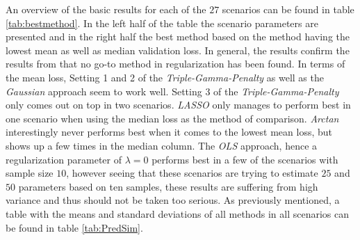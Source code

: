 \documentclass[12pt,a4paper]{article}
\begin{document}
An overview of the basic results for each of the $27$ scenarios can be found in table \ref{tab:bestmethod}. In the left half of the table the scenario parameters are presented and in the right half the best method based on the method having the lowest mean as well as median validation loss. In general, the results confirm the results from \textcite{WangEtAl2020} that no go-to method in regularization has been found. In terms of the mean loss, Setting 1 and 2 of the \textit{Triple-Gamma-Penalty} as well as the \textit{Gaussian} approach seem to work well. Setting 3 of the \textit{Triple-Gamma-Penalty} only comes out on top in two scenarios. \textit{LASSO} only manages to perform best in one scenario when using the median loss as the method of comparison. \textit{Arctan} interestingly never performs best when it comes to the lowest mean loss, but shows up a few times in the median column. The \textit{OLS} approach, hence a regularization parameter of $\lambda = 0$ performs best in a few of the scenarios with sample size $10$, however seeing that these scenarios are trying to estimate $25$ and $50$ parameters based on ten samples, these results are suffering from high variance and thus should not be taken too serious. As previously mentioned, a table with the means and standard deviations of all methods in all scenarios can be found in table \ref{tab:PredSim}.
\end{document}
